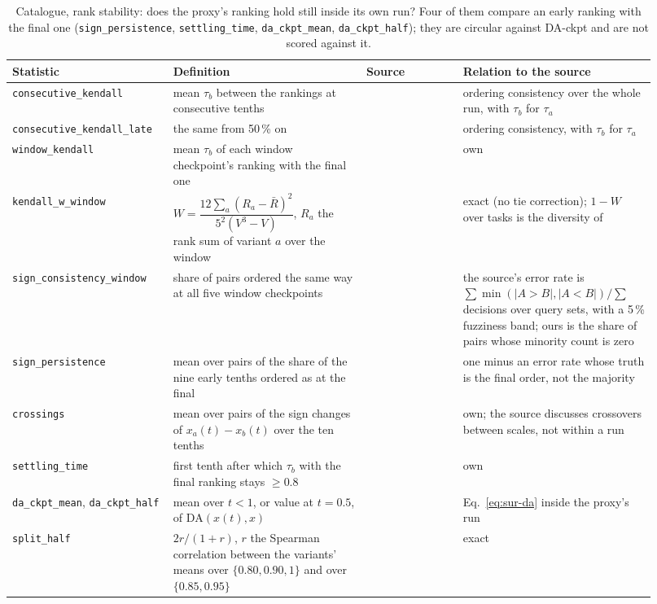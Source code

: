 \begin{table}[h]
\centering
\scriptsize
\begin{tabular}{@{}p{0.215\linewidth}p{0.28\linewidth}p{0.14\linewidth}p{0.285\linewidth}@{}}
\toprule
\textbf{Statistic} & \textbf{Definition} & \textbf{Source} & \textbf{Relation to the source} \\
\midrule
\texttt{consecutive\_kendall} & mean $\tau_b$ between the rankings at consecutive tenths & \citet{kydlicek_finetasks_nodate} & ordering consistency over the whole run, with $\tau_b$ for $\tau_a$ \\
\texttt{consecutive\_kendall\_late} & the same from 50\,\% on & \citet{kydlicek_finetasks_nodate} & ordering consistency, with $\tau_b$ for $\tau_a$ \\
\texttt{window\_kendall} & mean $\tau_b$ of each window checkpoint's ranking with the final one & \citet{heineman_signal_2025} & own \\
\texttt{kendall\_w\_window} & $W = \dfrac{12\sum_a (R_a - \bar{R})^2}{5^2 (V^3 - V)}$, $R_a$ the rank sum of variant $a$ over the window & \citet{kendall_problem_1939} & exact (no tie correction); $1 - W$ over tasks is the diversity of \citet{zhang_inherent_2024} \\
\texttt{sign\_consistency\_window} & share of pairs ordered the same way at all five window checkpoints & \citet{buckley_evaluating_2000} & the source's error rate is $\sum \min(|A{>}B|, |A{<}B|) / \sum$ decisions over query sets, with a 5\,\% fuzziness band; ours is the share of pairs whose minority count is zero \\
\texttt{sign\_persistence} & mean over pairs of the share of the nine early tenths ordered as at the final & \citet{buckley_evaluating_2000} & one minus an error rate whose truth is the final order, not the majority \\
\texttt{crossings} & mean over pairs of the sign changes of $x_a(t) - x_b(t)$ over the ten tenths & \citet{magnusson_datadecide_2025} & own; the source discusses crossovers between scales, not within a run \\
\texttt{settling\_time} & first tenth after which $\tau_b$ with the final ranking stays $\geq 0.8$ & \citet{magnusson_datadecide_2025} & own \\
\texttt{da\_ckpt\_mean}, \texttt{da\_ckpt\_half} & mean over $t < 1$, or value at $t = 0.5$, of $\mathrm{DA}(x(t), x)$ & \citet{heineman_signal_2025, magnusson_datadecide_2025} & Eq.~\ref{eq:sur-da} inside the proxy's run \\
\texttt{split\_half} & $2r/(1+r)$, $r$ the Spearman correlation between the variants' means over $\{0.80, 0.90, 1\}$ and over $\{0.85, 0.95\}$ & \citet{spearman_correlation_1910, brown_experimental_1910} & exact \\
\bottomrule
\end{tabular}
\caption{Catalogue, rank stability: does the proxy's ranking hold still inside its own run? Four of them compare an early ranking with the final one (\texttt{sign\_persistence}, \texttt{settling\_time}, \texttt{da\_ckpt\_mean}, \texttt{da\_ckpt\_half}); they are circular against DA-ckpt and are not scored against it.}
\label{tab:sur-stability}
\end{table}


